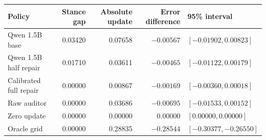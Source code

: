 \begin{tabular}{lrrrl}
\toprule
Policy & Stance gap & Absolute update & Error difference & 95\% interval \\
\midrule
Qwen 1.5B base & 0.03420 & 0.07658 & $-0.00567$ & $[-0.01902, 0.00823]$ \\
Qwen 1.5B half repair & 0.01710 & 0.03611 & $-0.00465$ & $[-0.01122, 0.00179]$ \\
Calibrated full repair & 0.00000 & 0.00867 & $-0.00169$ & $[-0.00360, 0.00018]$ \\
Raw auditor & 0.00000 & 0.03686 & $-0.00695$ & $[-0.01533, 0.00152]$ \\
Zero update & 0.00000 & 0.00000 & $0.00000$ & $[0.00000, 0.00000]$ \\
Oracle grid & 0.00000 & 0.28835 & $-0.28544$ & $[-0.30377, -0.26550]$ \\
\bottomrule
\end{tabular}
